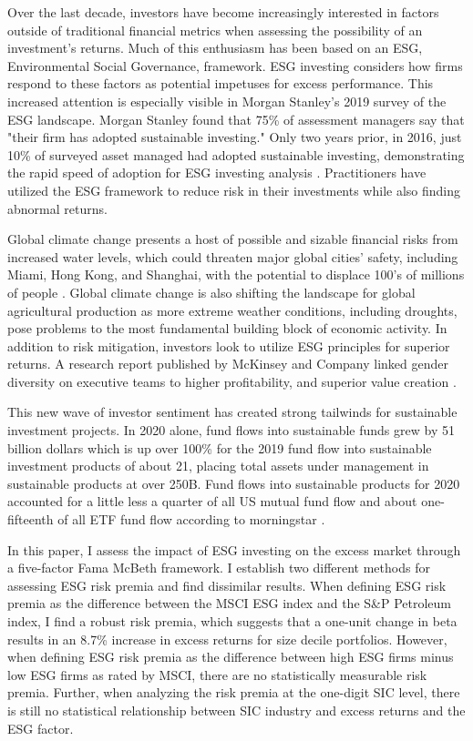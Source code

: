 Over the last decade, investors have become increasingly interested in factors outside of traditional financial metrics when assessing the possibility of an investment's returns. Much of this enthusiasm has been based on an ESG, Environmental Social Governance, framework. ESG investing considers how firms respond to these factors as potential impetuses for excess performance. This increased attention is especially visible in Morgan Stanley's 2019 survey of the ESG landscape. Morgan Stanley  found that 75\% of assessment managers say that "their firm has adopted sustainable investing." Only two years prior, in 2016, just 10\% of surveyed asset managed had adopted sustainable investing, demonstrating the rapid speed of adoption for ESG investing analysis \cite{morgan_stanley_sustainable_2019}. Practitioners have utilized the ESG framework to reduce risk in their investments while also finding abnormal returns.

Global climate change presents a host of possible and sizable financial risks from increased water levels, which could threaten major global cities' safety, including Miami, Hong Kong, and Shanghai, with the potential to displace 100's of millions of people \cite{holder_three-degree_nodate}. Global climate change is also shifting the landscape for global agricultural production as more extreme weather conditions, including droughts, pose problems to the most fundamental building block of economic activity. In addition to risk mitigation, investors look to utilize  ESG principles for superior returns. A research report published by McKinsey and Company linked gender diversity on executive teams to higher profitability, and superior value creation \cite{mckinsey_diversity}.

This new wave of investor sentiment has created strong tailwinds for sustainable investment projects. In 2020 alone, fund flows into sustainable funds grew by 51 billion dollars which is up over 100\% for the 2019 fund flow into sustainable investment products of about 21, placing total assets under management in sustainable products at over 250B. Fund flows into sustainable products for 2020 accounted for a little less a quarter of all US mutual fund flow and about one-fifteenth of all ETF fund flow according to morningstar \cite{monring_star_ESG}.

In this paper, I assess the impact of ESG investing on the excess market through a five-factor Fama McBeth framework. I establish two different methods for assessing ESG risk premia and find dissimilar results. When defining ESG risk premia as the difference between the MSCI ESG index and the S\&P Petroleum index, I find a robust risk premia, which suggests that a one-unit change in beta results in an 8.7\% increase in excess returns for size decile portfolios. However, when defining ESG risk premia as the difference between high ESG firms minus low ESG firms as rated by MSCI, there are no statistically measurable risk premia. Further, when analyzing the risk premia at the one-digit SIC level, there is still no statistical relationship between SIC industry and excess returns and the ESG factor. 

